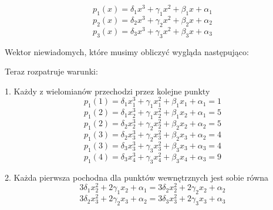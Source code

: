 \documentclass[varwidth,12pt,a4paper]{article}
\begin{document}
\begin{equation}
    p_1(x) = \delta _1 x^3 + \gamma _1 x^2 + \beta _1 x + \alpha _1
\end{equation}
\begin{equation}
    p_2(x) = \delta _2 x^3 + \gamma _2 x^2 + \beta _2 x + \alpha _2
\end{equation}
\begin{equation}
    p_3(x) = \delta _3 x^3 + \gamma _3 x^2 + \beta _3 x + \alpha _3
\end{equation}

Wektor niewiadomych, które musimy obliczyć wygląda następująco:
\begin{equation}
    [\delta _1, \delta_2, \delta_3, \gamma _1, \gamma _2, \gamma_3, \beta _1, \beta _2, \beta _3, \alpha _1, \alpha _2, \alpha _3 ]
\end{equation}


Teraz rozpatruje warunki:

1. Każdy z wielomianów przechodzi przez kolejne punkty
\begin{equation}
    p_1(1) = \delta _1 x_1^3 + \gamma _1 x_1^2 + \beta _1 x_1 + \alpha _1 = 1
\end{equation}
\begin{equation}
    p_1(2) = \delta _1 x_2^3 + \gamma _1 x_2^2 + \beta _1 x_2 + \alpha _1 = 5
\end{equation}
\begin{equation}
    p_1(2) = \delta _2 x_2^3 + \gamma _2 x_2^2 + \beta _2 x_2 + \alpha _2 = 5
\end{equation}
\begin{equation}
    p_1(3) = \delta _2 x_3^3 + \gamma _2 x_3^2 + \beta _2 x_3 + \alpha _2 = 4
\end{equation}
\begin{equation}
    p_1(3) = \delta _3 x_3^3 + \gamma _3 x_3^2 + \beta _3 x_3 + \alpha _3 = 4
\end{equation}
\begin{equation}
    p_1(4) = \delta _3 x_4^3 + \gamma _3 x_4^2 + \beta _3 x_4 + \alpha _3 = 9
\end{equation}

2. Każda pierwsza pochodna dla punktów wewnętrznych jest sobie równa
\begin{equation}
    3 \delta _1 x_2 ^2 + 2 \gamma _1 x_2 + \alpha _1 = 3 \delta _2 x_2 ^2 + 2 \gamma _2 x_2 + \alpha _2
\end{equation}
\begin{equation}
    3 \delta _2 x_3 ^2 + 2 \gamma _2 x_3 + \alpha _2 = 3 \delta _3 x_3 ^2 + 2 \gamma _3 x_3 + \alpha _3
\end{equation}
\end{document}
